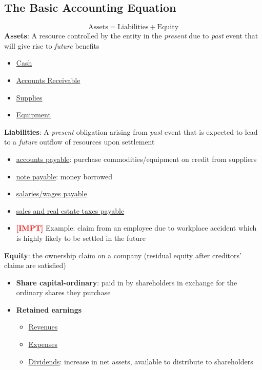 \documentclass{article}
\newcommand{\impt}[0]{\textcolor{red}{\textbf{[IMPT] }}}
\begin{document}
\begin{multicols}{2}
\subsection{The Basic Accounting Equation}
$$\text{Assets} = \text{Liabilities} + \text{Equity}$$
\textbf{Assets}:  A resource controlled by the entity in the \textit{present} due to \textit{past} event that will give rise to \textit{future} benefits
	\begin{itemize}
		\item \underline{Cash}
		\item \underline{Accounts Receivable}
		\item \underline{Supplies}
		\item \underline{Equipment}
	\end{itemize}
\textbf{Liabilities}: A \textit{present} obligation arising from \textit{past} event that is expected to lead to a \textit{future} outflow of resources upon settlement
	 \begin{itemize}
	 	\item \underline{accounts payable}: purchase commodities/equipment on credit from suppliers
	 	\item \underline{note payable}: money borrowed
	 	\item \underline{salaries/wages payable}
	 	\item \underline{sales and real estate taxes payable}
	 	\item \impt Example: claim from an employee due to workplace accident which is highly likely to be settled in the future 
	 \end{itemize}
\textbf{Equity}: the ownership claim on a company (residual equity after creditors' claims are satisfied)
	 \begin{itemize}
	 	\item \textbf{Share capital-ordinary}: paid in by shareholders in exchange for the ordinary shares they purchase 
	 	\item \textbf{Retained earnings}
	 	\begin{itemize}
	 		\item \underline{Revenues}
	 		\item \underline{Expenses}
	 		\item \underline{Dividends}: increase in net assets, available to distribute to shareholders
	 	\end{itemize}
	 \end{itemize}


\end{multicols}
\end{document}
